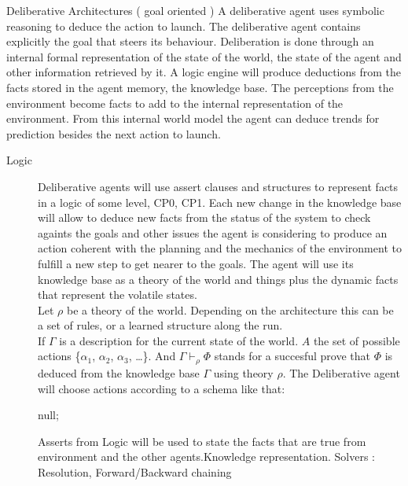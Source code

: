 \documentclass{report}
\begin{document}
\begin{description}
	\item Deliberative Architectures ( goal oriented )
	A deliberative agent uses symbolic reasoning to deduce the action to launch. The deliberative agent
	contains explicitly the goal that steers its behaviour. Deliberation is done through an internal formal 
	representation of the state of the world, the state of the agent and other information retrieved by
	it. A logic engine will produce deductions from the facts stored in the agent memory, the knowledge
	base. The perceptions from the environment become facts to add to the internal representation of
	the environment. From this internal world model the agent can deduce trends for prediction besides
	the next action to launch. 
	\begin{description} 
		\item [Logic] Deliberative agents will use assert clauses and structures to represent facts in 
		a logic of some level, CP0, CP1. Each new change in the knowledge base will allow to deduce
		new facts from the status of the system to check againts the goals and other issues the agent
		is considering to produce an action coherent with the planning and the mechanics of the environment
		to fulfill a new step to get nearer to the goals.
		The agent will use its knowledge base as a theory of the world and things plus the dynamic facts
		that represent the volatile states.\\
		Let $\rho$ be a theory of the world. Depending on the architecture this can be a set of rules,
		or a learned structure along the run.\\ 
		If $\Gamma$ is a description for the current state of the world. $A$ the set of possible actions 
		\{$\alpha_1$, $\alpha_2$, $\alpha_3$, \ldots\}. And $\Gamma \vdash_{\rho} \Phi$ stands for a succesful 
		prove that $\Phi$ is deduced from the knowledge base $\Gamma$ using theory $\rho$. The Deliberative 
		agent will choose actions according to a schema like that:

		\begin{algorithm}[H]

		\Return null;
		\end{algorithm}

		Asserts from Logic will be used to state the facts that are true from environment
		and the other agents.Knowledge representation. Solvers : Resolution, Forward/Backward chaining
		

\end{description}
\end{description}
\end{document}
